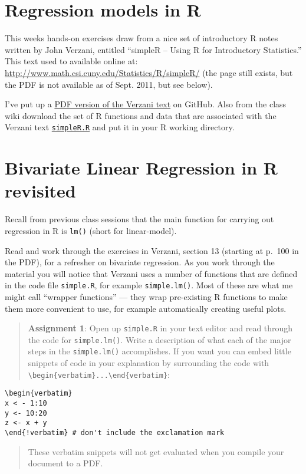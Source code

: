 \documentclass{article}
\begin{document}
\section{Regression models in R}

This weeks hands-on exercises draw from a nice set of introductory R
notes written by John Verzani, entitled ``simpleR -- Using R for
Introductory Statistics.'' This text used to available online at:
\url{http://www.math.csi.cuny.edu/Statistics/R/simpleR/} (the page still
exists, but the PDF is not available as of Sept. 2011, but see below).

I've put up a
\href{https://raw.github.com/pmagwene/Bio313/master/lecture-04/simpleR.pdf}{PDF
version of the Verzani text} on GitHub. Also from the class wiki
download the set of R functions and data that are associated with the
Verzani text
\href{https://raw.github.com/pmagwene/Bio313/master/lecture-04/simpleR.R}{\lstinline!simpleR.R!}
and put it in your R working directory.

\section{Bivariate Linear Regression in R revisited}

Recall from previous class sessions that the main function for carrying
out regression in R is \lstinline!lm()! (short for linear-model).

Read and work through the exercises in Verzani, section 13 (starting at
p.~100 in the PDF), for a refresher on bivariate regression. As you work
through the material you will notice that Verzani uses a number of
functions that are defined in the code file \lstinline!simple.R!, for
example \lstinline!simple.lm()!. Most of these are what me might call
``wrapper functions'' --- they wrap pre-existing R functions to make
them more convenient to use, for example automatically creating useful
plots.

\begin{quote}
\textbf{Assignment 1}: Open up \lstinline!simple.R! in your text editor
and read through the code for \lstinline!simple.lm()!. Write a
description of what each of the major steps in the
\lstinline!simple.lm()! accomplishes. If you want you can embed little
snippets of code in your explanation by surrounding the code with
\lstinline!\begin{verbatim}...\end{verbatim}!:

\end{quote}
\begin{lstlisting}
\begin{verbatim}
x < - 1:10
y <- 10:20
z <- x + y
\end{!verbatim} # don't include the exclamation mark
\end{lstlisting}
\begin{quote}
These verbatim snippets will not get evaluated when you compile your
document to a PDF.

\end{quote}
\end{document}
